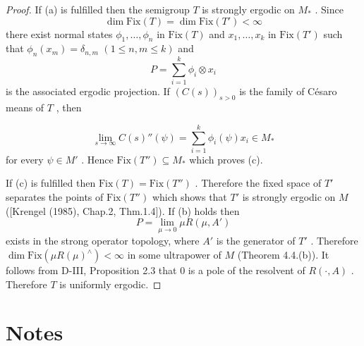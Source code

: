 \begin{proof}
If (a) is fulfilled then the semigroup $ T $  is strongly ergodic on $ M_{*} $ .
Since
\[
\dim \text{Fix}(T) = \dim \text{Fix}(T') < \infty
\]
there exist normal states $ \phi_{1},\ldots,\phi_{n} $  in $ \text{Fix}(T) $  and $ x_{1},\ldots,x_{k} $  in $ \text{Fix}(T') $  such that $ \phi_{n}(x_{m}) = \delta_{n,m} $  $ (1 \leq n,m \leq k) $  and
\[
P = \sum_{i=1}^{k} \phi_{i} \otimes x_{i}
\]
is the associated ergodic projection.
If $ (C(s))_{s>0} $  is the family of Césaro means of $ T $ , then

\newpage

\[
\lim_{s \to \infty} C(s)''(\psi) = \sum_{i=1}^{k} \phi_{i}(\psi)x_{i} \in M_{*}
\]
for every $ \psi \in M' $ .
Hence $ \text{Fix}(T'') \subseteq M_{*} $  which proves (c).

If (c) is fulfilled then $ \text{Fix}(T) = \text{Fix}(T'') $ .
Therefore the fixed space of $ T' $  separates the points of $ \text{Fix}(T'') $  which shows that $ T' $  is strongly ergodic on $ M $  ([Krengel (1985), Chap.2, Thm.1.4]).
If (b) holds then
\[
P = \lim_{\mu \to 0} \mu R(\mu,A')
\]
exists in the strong operator topology, where $ A' $  is the generator of $ T' $ .
Therefore $ \dim \text{Fix}(\mu R(\mu)^{\wedge}) < \infty $  in some ultrapower of $ M $  (Theorem 4.4.(b)).
It follows from D-III, Proposition 2.3 that 0 is a pole of the resolvent of $ R(\cdot,A) $ .
Therefore $ T $  is uniformly ergodic.
\end{proof}

\section*{Notes}\label{notes:d4-notes}

